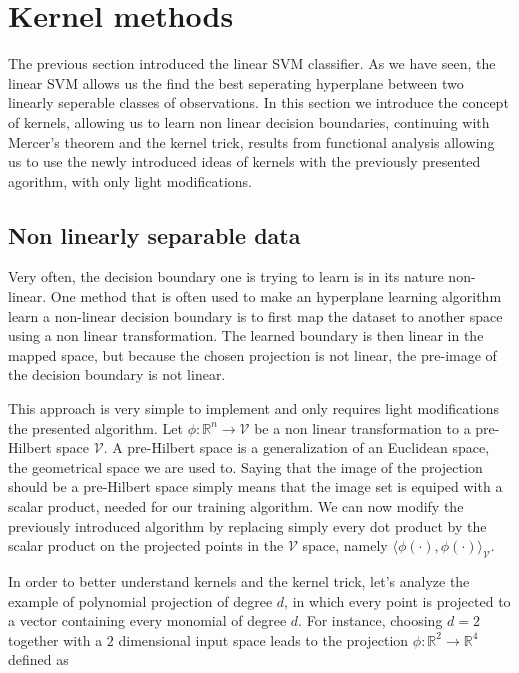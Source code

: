 \section{Kernel methods}

The previous section introduced the linear SVM classifier. As we have seen, the linear SVM  allows us the find the best seperating hyperplane between two linearly seperable classes of observations. In this section we introduce the concept of kernels, allowing us to learn non linear decision boundaries, continuing with Mercer's theorem and the kernel trick, results from functional analysis allowing us to use the newly introduced ideas of kernels with the previously presented agorithm, with only light modifications.

\subsection{Non linearly separable data}

Very often, the decision boundary one is trying to learn is in its nature non-linear. One method that is often used to make an hyperplane learning algorithm learn a non-linear decision boundary is to first map the dataset to another space using a non linear transformation. The learned boundary is then linear in the mapped space, but because the chosen projection is not linear, the pre-image of the decision boundary is not linear.

This approach is very simple to implement and only requires light modifications the presented algorithm. Let $\phi : \mathbb{R}^n \rightarrow \mathcal{V}$ be a non linear transformation to a pre-Hilbert space $\mathcal{V}$. A pre-Hilbert space is a generalization of an Euclidean space, the geometrical space we are used to. Saying that the image of the projection should be a pre-Hilbert space simply means that the image set is equiped with a scalar product, needed for our training algorithm. We can now modify the previously introduced algorithm by replacing simply every dot product by the scalar product on the projected points in the $\mathcal{V}$ space, namely $\langle \phi(\cdot), \phi(\cdot)\rangle _{\mathcal{V}}$.

In order to better understand kernels and the kernel trick, let's analyze the example of polynomial projection of degree $d$, in which every point is projected to a vector containing every monomial of degree $d$. For instance, choosing $d = 2$ together with a $2$ dimensional input space leads to the projection $\phi : \mathbb{R}^2 \rightarrow \mathbb{R}^4$ defined as

